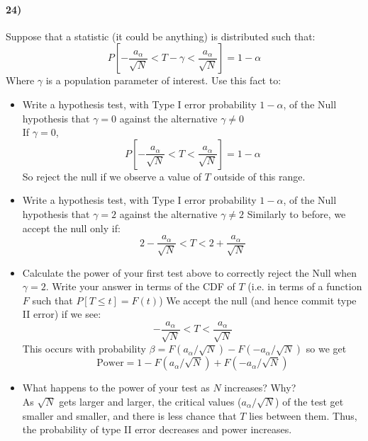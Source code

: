 \documentclass[12pt]{article}
\numberwithin{equation}{section}
\numberwithin{figure}{section}
\numberwithin{table}{section}
\begin{document}
\paragraph{24)} Suppose that a statistic (it could be anything) is distributed such that:
\[P[-\frac{a_\alpha}{\sqrt{N}} < T-\gamma < \frac{a_\alpha}{\sqrt{N}}]=1-\alpha\]
Where $\gamma$ is a population parameter of interest. Use this fact to:
\begin{itemize}
\item Write a hypothesis test, with Type I error probability $1-\alpha$, of the Null hypothesis that $\gamma=0$ against the alternative $\gamma\neq 0$ \\
{\color{blue}
If $\gamma=0$,
\[P[-\frac{a_\alpha}{\sqrt{N}} < T < \frac{a_\alpha}{\sqrt{N}}]=1-\alpha\]
So reject the null if we observe a value of $T$ outside of this range.
}
\item Write a hypothesis test, with Type I error probability $1-\alpha$, of the Null hypothesis that $\gamma=2$ against the alternative $\gamma\neq 2$
{\color{blue} Similarly to before, we accept the null only if:
\[2-\frac{a_\alpha}{\sqrt{N}} < T < 2+\frac{a_\alpha}{\sqrt{N}} \]
}
\item Calculate the power of your first test above to correctly reject the Null when $\gamma = 2$. Write your answer in terms of the CDF of $T$ (i.e. in terms of a function $F$ such that $P[T\leq t] = F(t)$)
{\color{blue} We accept the null (and hence commit type II error) if we see:
\[-\frac{a_\alpha}{\sqrt{N}} < T < \frac{a_\alpha}{\sqrt{N}}\]
This occurs with probability $\beta = F(a_{\alpha}/\sqrt{N})-F(-a_{\alpha}/\sqrt{N})$ so we get
\[\text{Power} = 1- F(a_{\alpha}/\sqrt{N})+F(-a_{\alpha}/\sqrt{N})\]
}
\item What happens to the power of your test as $N$ increases? Why? \\
{\color{blue}
As $\sqrt{N}$ gets larger and larger, the critical values ($a_\alpha/\sqrt{N}$) of the test get smaller and smaller, and there is less chance that $T$ lies between them. Thus, the probability of type II error decreases and power increases.
}
\end{itemize}
\end{document}
